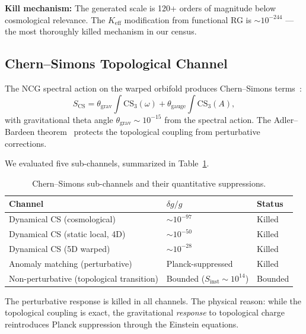 \textbf{Kill mechanism:} The generated scale is 120+ orders of magnitude below cosmological relevance. The $K_{\mathrm{eff}}$ modification from functional RG is ${\sim}10^{-244}$ --- the most thoroughly killed mechanism in our census.

\subsection{Chern--Simons Topological Channel}
\label{sec:3-chernsimons}

The NCG spectral action on the warped orbifold produces Chern--Simons terms~\cite{ch3:chernsimons1974}:
\begin{equation}
  S_{\mathrm{CS}} = \theta_{\mathrm{grav}}\int\mathrm{CS}_3(\omega) + \theta_{\mathrm{gauge}}\int\mathrm{CS}_3(A),
  \label{eq:3-24}
\end{equation}
with gravitational theta angle $\theta_{\mathrm{grav}} \sim 10^{-15}$ from the spectral action. The Adler--Bardeen theorem~\cite{ch3:adlerbardeen1969} protects the topological coupling from perturbative corrections.

We evaluated five sub-channels, summarized in Table~\ref{tab:3-chernsimons}.

\begin{table}[htbp]
\centering
\caption{Chern--Simons sub-channels and their quantitative suppressions.}
\label{tab:3-chernsimons}
\begin{tabular}{@{}lll@{}}
\toprule
Channel & $\delta g/g$ & Status \\
\midrule
Dynamical CS (cosmological)        & $\sim 10^{-97}$ & Killed  \\
Dynamical CS (static local, 4D)    & $\sim 10^{-50}$ & Killed  \\
Dynamical CS (5D warped)           & $\sim 10^{-28}$ & Killed  \\
Anomaly matching (perturbative)    & Planck-suppressed & Killed  \\
Non-perturbative (topological transition) & Bounded ($S_{\mathrm{inst}} \sim 10^{14}$) & Bounded \\
\bottomrule
\end{tabular}
\end{table}

The perturbative response is killed in all channels. The physical reason: while the topological coupling is exact, the gravitational \emph{response} to topological charge reintroduces Planck suppression through the Einstein equations.

